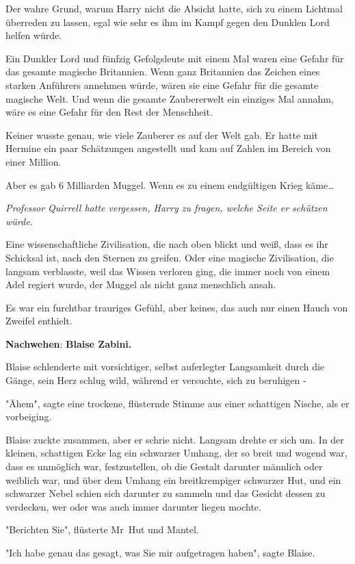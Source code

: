 {Der wahre Grund, warum Harry nicht die Absicht hatte, sich zu einem Lichtmal überreden zu lassen, egal wie sehr es ihm im Kampf gegen den Dunklen Lord helfen würde.

Ein Dunkler Lord und fünfzig Gefolgsleute mit einem Mal waren eine Gefahr für das gesamte magische Britannien. Wenn ganz Britannien das Zeichen eines starken Anführers annehmen würde, wären sie eine Gefahr für die gesamte magische Welt. Und wenn die gesamte Zaubererwelt ein einziges Mal annahm, wäre es eine Gefahr für den Rest der Menschheit.

Keiner wusste genau, wie viele Zauberer es auf der Welt gab. Er hatte mit Hermine ein paar Schätzungen angestellt und kam auf Zahlen im Bereich von einer Million.

Aber es gab 6 Milliarden Muggel. Wenn es zu einem endgültigen Krieg käme…

\emph{Professor Quirrell hatte vergessen, Harry zu fragen, welche Seite er schützen würde.}

Eine wissenschaftliche Zivilisation, die nach oben blickt und weiß, dass es ihr Schicksal ist, nach den Sternen zu greifen. Oder eine magische Zivilisation, die langsam verblasste, weil das Wissen verloren ging, die immer noch von einem Adel regiert wurde, der Muggel als nicht ganz menschlich ansah.

Es war ein furchtbar trauriges Gefühl, aber keines, das auch nur einen Hauch von Zweifel enthielt.

\textbf{Nachwehen}: \textbf{Blaise Zabini.}

Blaise schlenderte mit vorsichtiger, selbst auferlegter Langsamkeit durch die Gänge, sein Herz schlug wild, während er versuchte, sich zu beruhigen -

"Ähem", sagte eine trockene, flüsternde Stimme aus einer schattigen Nische, als er vorbeiging.

Blaise zuckte zusammen, aber er schrie nicht. Langsam drehte er sich um. In der kleinen, schattigen Ecke lag ein schwarzer Umhang, der so breit und wogend war, dass es unmöglich war, festzustellen, ob die Gestalt darunter männlich oder weiblich war, und über dem Umhang ein breitkrempiger schwarzer Hut, und ein schwarzer Nebel schien sich darunter zu sammeln und das Gesicht dessen zu verdecken, wer oder was auch immer darunter liegen mochte.

"Berichten Sie", flüsterte Mr~Hut und Mantel.

"Ich habe genau das gesagt, was Sie mir aufgetragen haben", sagte Blaise.

}

